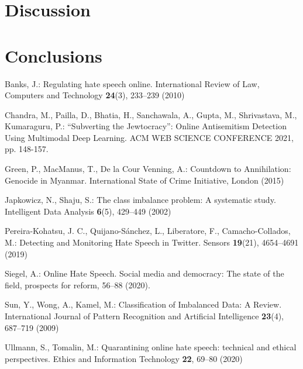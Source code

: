 \documentclass[runningheads]{llncs}
\begin{document}




\section{Discussion}



\section{Conclusions}



\begin{thebibliography}{6}
Banks, J.: Regulating hate speech online. International Review of Law, Computers and Technology \textbf{24}(3), 233--239 (2010)

Chandra, M., Pailla, D., Bhatia, H., Sanchawala, A., Gupta, M., Shrivastava, M., Kumaraguru, P.: ``Subverting the Jewtocracy'': Online Antisemitism Detection Using Multimodal Deep Learning.  ACM WEB SCIENCE CONFERENCE 2021, pp. 148-157. 

Green, P., MacManus, T., De la Cour Venning, A.: Countdown to Annihilation: Genocide in Myanmar. International State of Crime Initiative, London (2015)

Japkowicz, N., Shaju, S.: The class imbalance problem: A systematic study. Intelligent Data Analysis \textbf{6}(5), 429--449 (2002)

Pereira-Kohatsu, J. C., Quijano-Sánchez, L., Liberatore, F., Camacho-Collados, M.: Detecting and Monitoring Hate Speech in Twitter. Sensors \textbf{19}(21), 4654--4691 (2019)

Siegel, A.: Online Hate Speech. Social media and democracy: The state of the field, prospects for reform, 56--88 (2020).

Sun, Y., Wong, A., Kamel, M.: Classification of Imbalanced Data: A Review. International Journal of Pattern Recognition and Artificial Intelligence \textbf{23}(4), 687--719 (2009)

Ullmann, S., Tomalin, M.: Quarantining online hate speech: technical and ethical perspectives. Ethics and Information Technology \textbf{22}, 69--80 (2020)


\end{thebibliography}
\end{document}
